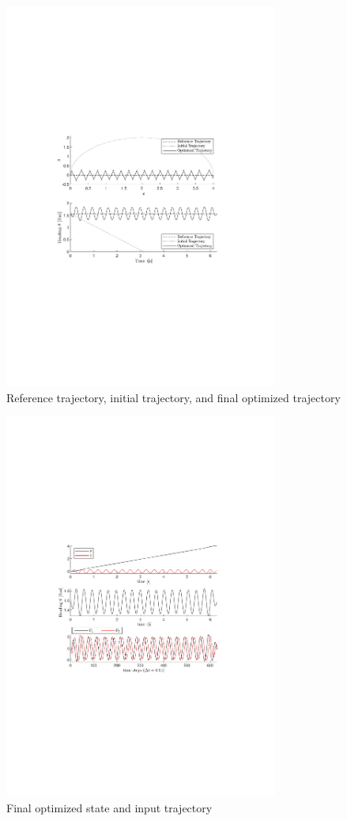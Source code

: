 \begin{figure}[h]
    \centering
    \includegraphics[width=0.8\textwidth]{1_1.pdf}
    \caption{Reference trajectory, initial trajectory, and final optimized trajectory}
\end{figure}
\begin{figure}[h]
    \centering
    \includegraphics[width=0.8\textwidth]{1_2.pdf}
    \centering
    \caption{Final optimized state and input trajectory}
\end{figure}